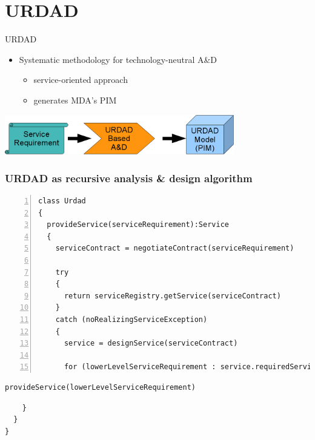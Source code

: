\section{URDAD}

\begin{frame}{URDAD}
   \begin{itemize} 
    \item Systematic methodology for technology-neutral A\&D
		\begin{itemize}
		  \item service-oriented approach
		  \item generates MDA's PIM
		\end{itemize}
   \end{itemize}

  \includegraphics[width=100mm]{urdadHighLevel}
\end{frame}



\begin{frame}[fragile]
  \frametitle{URDAD as recursive analysis \& design algorithm}

\lstset{language=pseudoCode}
\begin{lstlisting}[numbers=left,escapechar=|]
class Urdad
{
  provideService(serviceRequirement):Service
  {
    serviceContract = negotiateContract(serviceRequirement)
 
    try
    {
      return serviceRegistry.getService(serviceContract)
    }
    catch (noRealizingServiceException)
    {
      service = designService(serviceContract)

      for (lowerLevelServiceRequirement : service.requiredServices)
\end{lstlisting}
\vspace{-\baselineskip}
\begin{lstlisting}[backgroundcolor=\color{pink}]
        provideService(lowerLevelServiceRequirement)
\end{lstlisting}
\vspace{-\baselineskip}
\begin{lstlisting}
    }
  }
}
\end{lstlisting}
\end{frame}


